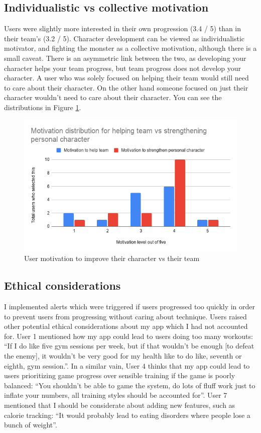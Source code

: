 \documentclass{l4proj}
\begin{document}
\subsection{Individualistic vs collective motivation}
Users were slightly more interested in their own progression (3.4 / 5) than in their team's (3.2 / 5). Character development can be viewed as individualistic motivator, and fighting the monster as a collective motivation, although there is a small caveat. There is an asymmetric link between the two, as developing your character helps your team progress, but team progress does not develop your character. A user who was solely focused on helping their team would still need to care about their character. On the other hand someone focused on just their character wouldn't need to care about their character. You can see the distributions in Figure \ref{fig:character_vs_team}.
\begin{figure}[H]
    \centering
    \includegraphics[width=1.0\linewidth]{moviation_distribution_team_character.png}    
    \caption{User motivation to improve their character vs their team}
    \label{fig:character_vs_team} 
\end{figure}


\subsection{Ethical considerations}
I implemented alerts which were triggered if users progressed too quickly in order to prevent users from progressing without caring about technique. Users raised other potential ethical considerations about my app which I had not accounted for. User 1 mentioned how my app could lead to users doing too many workouts: ``If I do like five gym sessions per week, but if that wouldn't be enough [to defeat the enemy], it wouldn't be very good for my health like to do like, seventh or eighth, gym session.''. In a similar vain, User 4 thinks that my app could lead to users prioritizing game progress over sensible training if the game is poorly balanced: ``You shouldn't be able to game the system, do lots of fluff work just to inflate your numbers, all training styles should be accounted for''. User 7 mentioned that I should be considerate about adding new features, such as calorie tracking: ``It would probably lead to eating disorders where people lose a bunch of weight''.
\end{document}

